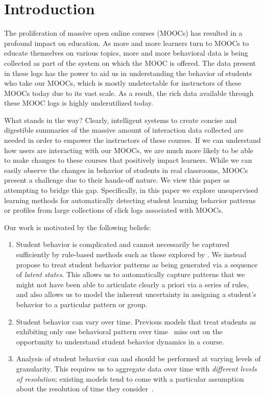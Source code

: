 \section{Introduction}
The proliferation of massive open online courses (MOOCs) has resulted in a
profound impact on education. As more and more learners turn to MOOCs to
educate themselves on various topics, more and more behavioral data is
being collected as part of the system on which the MOOC is offered. The
data present in these logs has the power to aid us in understanding the
behavior of students who take our MOOCs, which is mostly undetectable for
instructors of these MOOCs today due to its vast scale. As a result, the
rich data available through these MOOC logs is highly underutilized today.

What stands in the way? Clearly, intelligent systems to create concise and
digestible summaries of the massive amount of interaction data collected
are needed in order to empower the instructors of these courses. If we can
understand how users are interacting with our MOOCs, we are much more
likely to be able to make changes to these courses that positively impact
learners. While we can easily observe the changes in behavior of students
in real classrooms, MOOCs present a challenge due to their hands-off
nature. We view this paper as attempting to bridge this gap. Specifically,
in this paper we explore unsupervised learning methods for automatically
detecting student learning behavior patterns or profiles from large
collections of click logs associated with MOOCs.

Our work is motivated by the following beliefs:
\begin{enumerate}
  \item Student behavior is complicated and cannot necessarily be captured
      sufficiently by rule-based methods such as those explored by
      \citet{Kizilcec:2013:LAK}. We instead propose to treat
      student behavior patterns as being generated via a sequence of
      \emph{latent states}. This allows us to automatically capture
      patterns that we might not have been able to articulate clearly a
      priori via a series of rules, and also allows us to model the
      inherent uncertainty in assigning a student's behavior to a
      particular pattern or group.
  \item Student behavior can vary over time. Previous models that treat students
      as exhibiting only one behavioral pattern over
      time~\cite{Faucon:2016:EDM} miss out on the opportunity to understand
      student behavior dynamics in a course.
  \item Analysis of student behavior can and should be performed at varying
      levels of granularity. This requires us to aggregate data over time
      with \emph{different levels of resolution}; existing models tend to come
      with a particular assumption about the resolution of time they
      consider~\cite{Faucon:2016:EDM, Kizilcec:2013:LAK, Shih:2010:EDM}.
\end{enumerate}

